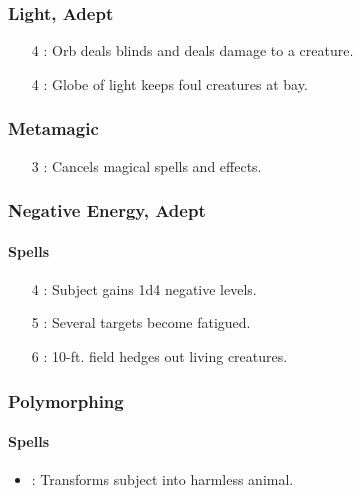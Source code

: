 \subsubsection{Light, Adept}
\begin{itemize}
 \item[4] : Orb deals blinds and deals damage to a creature.
 \item[4] : Globe of light keeps foul creatures at bay.
\end{itemize}

\subsubsection{Metamagic}
\begin{itemize}
 \item[3] : Cancels magical spells and effects.
\end{itemize}

\subsubsection{Negative Energy, Adept}
\label{Spec:NegativeEnergyAdept}
\paragraph{Spells}
\begin{itemize}
 \item[4] : Subject gains 1d4 negative levels.
 \item[5] : Several targets become fatigued.
 \item[6] : 10-ft. field hedges out living creatures.
\end{itemize}

\subsubsection{Polymorphing}
\label{Spec:Polymorphing}
\paragraph{Spells}
\begin{itemize}
 \item {}: Transforms subject into harmless animal.
\end{itemize}
